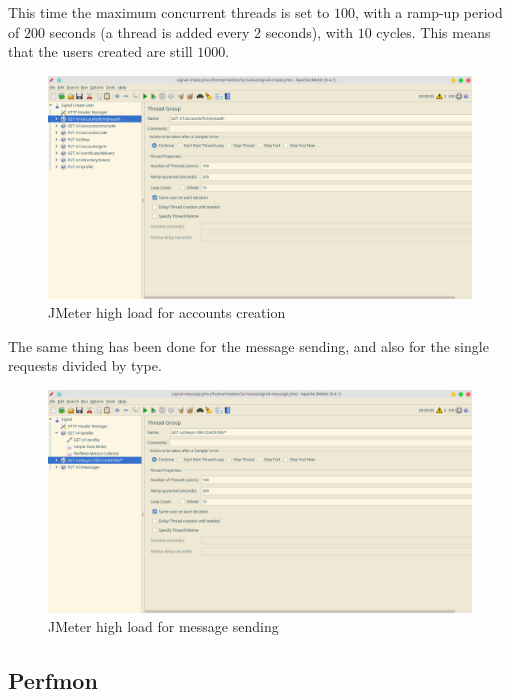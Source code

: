 This time the maximum concurrent threads is set to $100$, with a ramp-up period of $200$ seconds (a thread is added every $2$ seconds), with $10$ cycles.
This means that the users created are still $1000$.

\begin{figure}[H]
    \centering
    \includegraphics[width=\textwidth]{images/signal-create-load}
    \caption{JMeter high load for accounts creation}
    \label{fig:jmeterhighloadcreate}
\end{figure}

The same thing has been done for the message sending, and also for the single requests divided by type.

\begin{figure}[H]
    \centering
    \includegraphics[width=\textwidth]{images/signal-message-load}
    \caption{JMeter high load for message sending}
    \label{fig:jmeterhighloadmessage}
\end{figure}

\subsection{Perfmon\label{sec:perfmon}}

